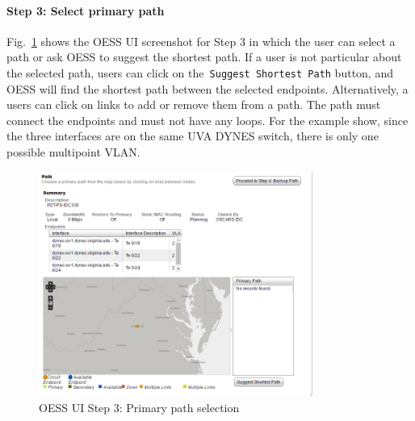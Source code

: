 \paragraph{Step 3: Select primary path}
Fig.~\ref{fig:oessprimary} shows the OESS UI screenshot for Step 3 in which the user can select a path or ask OESS to suggest the shortest path. If a user is not particular about the selected path, users can click on the\texttt{ Suggest Shortest Path} button, and OESS will find the shortest path between the selected endpoints. Alternatively, a users can click on links to add or remove them from a path. The path must connect the endpoints and must not have any loops. For the example show, since the three interfaces are on the same UVA DYNES switch, there is only one possible multipoint VLAN.
\begin{figure}[htb!]
\centering
\includegraphics[width=0.8\textwidth]{figures/oess-primary.png}
\caption{OESS UI Step 3: Primary path selection}
\label{fig:oessprimary}
\end{figure}

